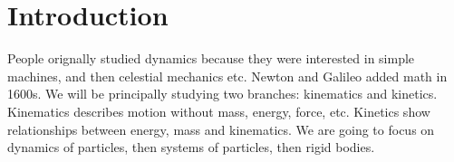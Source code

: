 \documentclass[a4paper]{article}
\begin{document}
\section*{Introduction}
People orignally studied dynamics because they were interested in simple machines, and then celestial mechanics etc. Newton and Galileo added math in 1600s. We will be principally studying two branches: kinematics and kinetics. Kinematics describes motion without mass, energy, force, etc. Kinetics show relationships between energy, mass and kinematics. We are going to focus on dynamics of particles, then systems of particles, then rigid bodies. 
\end{document}
